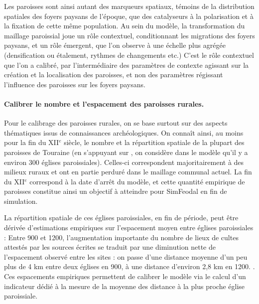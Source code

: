 Les paroisses sont ainsi autant des marqueurs spatiaux, témoins de la distribution spatiales des foyers paysans de l'époque, que des catalyseurs à la polarisation et à la fixation de cette même population.
Au sein du modèle, la transformation du maillage paroissial joue un rôle contextuel, conditionnant les migrations des foyers paysans, et un rôle émergent, que l'on observe à une échelle plus agrégée (densification ou étalement, rythmes de changements etc.)
C'est le rôle contextuel que l'on a calibré, par l'intermédiaire des paramètres de contexte agissant sur la création et la localisation des paroisses, et non des paramètres régissant l'influence des paroisses sur les foyers paysans.

\paragraph{Calibrer le nombre et l'espacement des paroisses \og rurales\fg{}.}

Pour le calibrage des paroisses \og rurales\fg{}, on se base surtout sur des aspects thématiques issus de connaissances archéologiques.
On connaît ainsi, au moins pour la fin du XII$^e$ siècle, le nombre et la répartition spatiale de la plupart des paroisses de Touraine (en s'appuyant sur \textcite[31]{zadora-rio_paroisses_2008}, on considère dans le modèle qu'il y a environ 300 églises paroissiales).
Celles-ci correspondent majoritairement à des milieux ruraux et ont en partie perduré dans le maillage communal actuel.
La fin du XII$^e$ correspond à la date d'arrêt du modèle, et cette quantité empirique de paroisses constitue ainsi un objectif à atteindre pour SimFeodal en fin de simulation.

La répartition spatiale de ces églises paroissiales, en fin de période, peut être dérivée d'estimations empiriques sur l'espacement moyen entre églises paroissiales :
\og Entre 900 et 1200, l'augmentation importante du nombre de lieux de cultes attestés par les sources écrites se traduit par une diminution nette de l'espacement observé entre les sites : on passe d'une distance moyenne d'un peu plus de 4 km entre deux églises en 900, à une distance d'environ 2,8 km en 1200.\fg{} \autocite[261]{chareille_dynamiques_2008}.
Ces espacements empiriques permettent de calibrer le modèle via le calcul d'un indicateur dédié à la mesure de la moyenne des distance à la plus proche église paroissiale.


